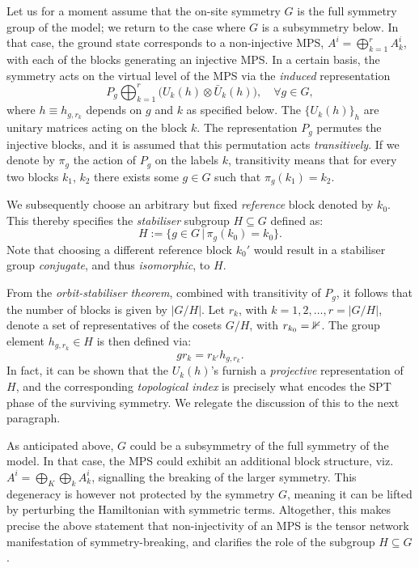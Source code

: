 \bigskip\noindent Let us for a moment assume that the on-site symmetry $G$ is the full symmetry group of the model; we return to the case where $G$ is a subsymmetry below. In that case, the ground state corresponds to a non-injective MPS, $A^i=\bigoplus_{k=1}^r A^i_k$, with each of the blocks generating an injective MPS. In a certain basis, the symmetry acts on the virtual level of the MPS via the \emph{induced} representation
\begin{equation}
	P_g \bigoplus_{k=1}^r \big( U_k(h) \otimes \bar U_k(h) \big), \quad\forall g\in G,
\end{equation}
where $h\equiv h_{g,r_k}$ depends on $g$ and $k$ as specified below. The $\{U_k(h)\}_h$ are unitary matrices acting on the block $k$. The representation $P_g$ permutes the injective blocks, and it is assumed that this permutation acts \emph{transitively}. If we denote by $\pi_g$ the action of $P_g$ on the labels $k$, transitivity means that for every two blocks $k_1$, $k_2$ there exists some $g\in G$ such that $\pi_g(k_1)=k_2$.

We subsequently choose an arbitrary but fixed \emph{reference} block denoted by $k_0$.  This thereby specifies the \emph{stabiliser} subgroup $H\subseteq G$ defined as:
\begin{equation}
	H := \{g\in G \,|\, \pi_g(k_0) = k_0\}.
\end{equation}
Note that choosing a different reference block $k_0'$ would result in a stabiliser group \emph{conjugate}, and thus \emph{isomorphic}, to $H$.

From the \emph{orbit-stabiliser theorem}, combined with transitivity of $P_g$, it follows that the number of blocks is given by $|G/H|$. Let $r_k$, with $k=1,2,\dots,r=|G/H|$, denote a set of representatives of the cosets $G/H$, with $r_{k_0}=\mathbb 1$. The group element $h_{g,r_k}\in H$ is then defined via:
\begin{equation}
	gr_k = r_{k'} h_{g,r_k}.
\end{equation}
In fact, it can be shown that the $U_k(h)$'s furnish a \emph{projective} representation of $H$, and the corresponding \emph{topological index} is precisely what encodes the SPT phase of the surviving symmetry. We relegate the discussion of this to the next paragraph.

As anticipated above, $G$ could be a subsymmetry of the full symmetry of the model. In that case, the MPS could exhibit an additional block structure, viz. $A^i = \bigoplus_K\bigoplus_k A_k^i$, signalling the breaking of the larger symmetry. This degeneracy is however not protected by the symmetry $G$, meaning it can be lifted by perturbing the Hamiltonian with symmetric terms. Altogether, this makes precise the above statement that non-injectivity of an MPS is the tensor network manifestation of symmetry-breaking, and clarifies the role of the subgroup $H\subseteq G$.


